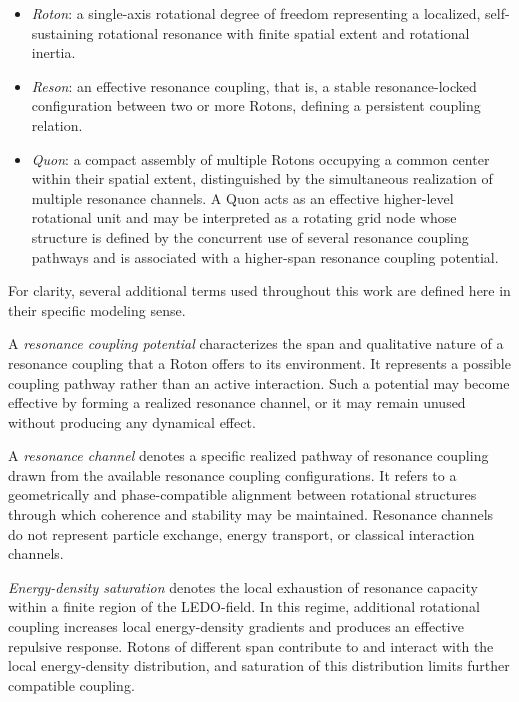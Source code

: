 \documentclass[11pt,a4paper]{article}
\begin{document}
\begin{itemize}
  \item \emph{Roton}: a single-axis rotational degree of freedom representing a localized,
  self-sustaining rotational resonance with finite spatial extent and rotational inertia.

  \item \emph{Reson}: an effective resonance coupling, that is, a stable resonance-locked
  configuration between two or more Rotons, defining a persistent coupling relation.

\item \emph{Quon}: a compact assembly of multiple Rotons occupying a common center within
their spatial extent, distinguished by the simultaneous realization of multiple resonance
channels. A Quon acts as an effective higher-level rotational unit and may be interpreted as
a rotating grid node whose structure is defined by the concurrent use of several resonance
coupling pathways and is associated with a higher-span resonance coupling potential.

\end{itemize}

For clarity, several additional terms used throughout this work are defined here in their
specific modeling sense.

A \emph{resonance coupling potential} characterizes the span and qualitative nature of a
resonance coupling that a Roton offers to its environment. It represents a possible
coupling pathway rather than an active interaction. Such a potential may become effective
by forming a realized resonance channel, or it may remain unused without producing any
dynamical effect.

A \emph{resonance channel} denotes a specific realized pathway of resonance coupling drawn
from the available resonance coupling configurations. It refers to a geometrically and
phase-compatible alignment between rotational structures through which coherence and
stability may be maintained. Resonance channels do not represent particle exchange, energy
transport, or classical interaction channels.

\emph{Energy-density saturation} denotes the local exhaustion of resonance capacity within a
finite region of the LEDO-field. In this regime, additional rotational coupling increases
local energy-density gradients and produces an effective repulsive response. Rotons of
different span contribute to and interact with the local energy-density distribution, and
saturation of this distribution limits further compatible coupling.
\end{document}
